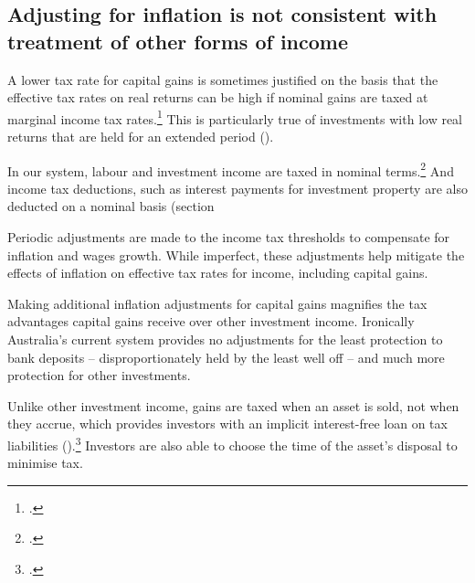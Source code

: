 \documentclass{grattan}\usepackage[]{graphicx}\usepackage[]{color}
\begin{document}
\subsection{Adjusting for inflation is not consistent with treatment of other forms of income}
A lower tax rate for capital gains is sometimes justified on the basis that the effective tax rates on real returns can be high if nominal gains are taxed at marginal income tax rates.\footcite{Treasury2010} This is particularly true of investments with low real returns that are held for an extended period ().

In our system, labour and investment income are taxed in nominal terms.\footcite{Treasury2010}  And income tax deductions, such as interest payments for investment property are also deducted on a nominal basis (section 

Periodic adjustments are made to the income tax thresholds to compensate for inflation and wages growth. While imperfect, these adjustments help mitigate the effects of inflation on effective tax rates for income, including capital gains.

Making additional inflation adjustments for capital gains magnifies the tax advantages capital gains receive over other investment income. Ironically Australia's current system provides no adjustments for the least protection to bank deposits -- disproportionately held by the least well off -- and much more protection for other investments.

Unlike other investment income, gains are taxed when an asset is sold, not when they accrue, which provides investors with an implicit interest-free loan on tax liabilities ().\footcites[See also:][p.~2]{Fane2004}[p.~12]{Ingles2009} Investors are also able to choose the time of the asset's disposal to minimise tax. 
\end{document}
